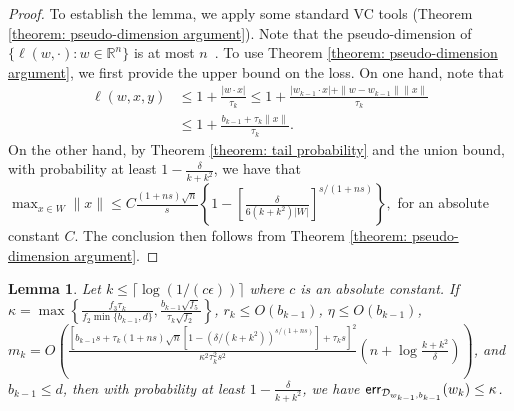\documentclass[11pt]{article}
\newcommand{\cD}{\mathcal{D}}
\newcommand{\R}{\mathbb{R}}
\newcommand{\err}{\textup{\textsf{err}}}
\newtheorem{lemma}[theorem]{Lemma}
\begin{document}
{{{{\begin{proof}
To establish the lemma, we apply some standard VC tools (Theorem \ref{theorem: pseudo-dimension argument}). Note that the pseudo-dimension of $\{\ell(w,\cdot):w\in\R^n\}$ is at most $n$~\cite{awasthi2014power}. To use Theorem \ref{theorem: pseudo-dimension argument}, we first provide the upper bound on the loss. On one hand, note that
\begin{equation*}
\begin{split}
\ell(w,x,y)&\le 1+\frac{|w\cdot x|}{\tau_k}\le 1+\frac{|w_{k-1}\cdot x|+\|w-w_{k-1}\|\|x\|}{\tau_k}\\
&\le 1+\frac{b_{k-1}+\tau_k\|x\|}{\tau_k}.
\end{split}
\end{equation*}
On the other hand, by Theorem \ref{theorem: tail probability} and the union bound, with probability at least $1-\frac{\delta}{k+k^2}$, we have that
$
\max_{x\in W} \|x\|\le C\frac{(1+ns)\sqrt{n}}{s}\left\{1-\left[\frac{\delta}{6(k+k^2)|W|}\right]^{s/(1+ns)}\right\},
$
for an absolute constant $C$. The conclusion then follows from Theorem \ref{theorem: pseudo-dimension argument}.
\end{proof}



\begin{lemma}
\label{lemma: adversarial noise induction}
Let $k\le\lceil\log (1/(c\epsilon))\rceil$ where $c$ is an absolute constant. If $\kappa=\max\left\{\frac{f_3\tau_k}{f_2\min\{b_{k-1},d\}},\frac{b_{k-1}\sqrt{f_5}}{\tau_k\sqrt{f_2}}\right\}$, $r_k\le O(b_{k-1})$, $\eta\le O(b_{k-1})$, $m_k=O\left( \frac{[b_{k-1}s+\tau_k(1+ns)\sqrt{n}[1-(\delta/(k+k^2))^{s/(1+ns)}]+\tau_ks]^2}{\kappa^2\tau_k^2s^2}\left(n+\log \frac{k+k^2}{\delta}\right)\right)$, and $b_{k-1}\le d$, then with probability at least $1-\frac{\delta}{k+k^2}$, we have $\err_{\cD_{w_{k-1},b_{k-1}}}(w_k)\le \kappa$.
\end{lemma}

}}}}
\end{document}
